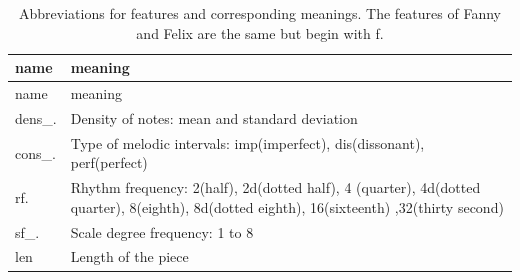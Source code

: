 \documentclass[12pt,twoside]{reedthesis}
\theoremstyle{definition}
\theoremstyle{definition}
\theoremstyle{definition}
\theoremstyle{remark}
\begin{document}
\begin{longtable}[]{@{}ll@{}}
\caption{Abbreviations for features and corresponding meanings. The
features of Fanny and Felix are the same but begin with
f.}\tabularnewline
\toprule
\begin{minipage}[b]{0.11\columnwidth}\raggedright\strut
name\strut
\end{minipage} & \begin{minipage}[b]{0.83\columnwidth}\raggedright\strut
meaning\strut
\end{minipage}\tabularnewline
\midrule
\endfirsthead
\toprule
\begin{minipage}[b]{0.11\columnwidth}\raggedright\strut
name\strut
\end{minipage} & \begin{minipage}[b]{0.83\columnwidth}\raggedright\strut
meaning\strut
\end{minipage}\tabularnewline
\midrule
\endhead
\begin{minipage}[t]{0.11\columnwidth}\raggedright\strut
dens\_.\strut
\end{minipage} & \begin{minipage}[t]{0.83\columnwidth}\raggedright\strut
Density of notes: mean and standard deviation\strut
\end{minipage}\tabularnewline
\begin{minipage}[t]{0.11\columnwidth}\raggedright\strut
cons\_.\strut
\end{minipage} & \begin{minipage}[t]{0.83\columnwidth}\raggedright\strut
Type of melodic intervals: imp(imperfect), dis(dissonant),
perf(perfect)\strut
\end{minipage}\tabularnewline
\begin{minipage}[t]{0.11\columnwidth}\raggedright\strut
rf.\strut
\end{minipage} & \begin{minipage}[t]{0.83\columnwidth}\raggedright\strut
Rhythm frequency: 2(half), 2d(dotted half), 4 (quarter), 4d(dotted
quarter), 8(eighth), 8d(dotted eighth), 16(sixteenth) ,32(thirty
second)\strut
\end{minipage}\tabularnewline
\begin{minipage}[t]{0.11\columnwidth}\raggedright\strut
sf\_.\strut
\end{minipage} & \begin{minipage}[t]{0.83\columnwidth}\raggedright\strut
Scale degree frequency: 1 to 8\strut
\end{minipage}\tabularnewline
\begin{minipage}[t]{0.11\columnwidth}\raggedright\strut
len\strut
\end{minipage} & \begin{minipage}[t]{0.83\columnwidth}\raggedright\strut
Length of the piece\strut
\end{minipage}\tabularnewline
\bottomrule
\end{longtable}
\end{document}

